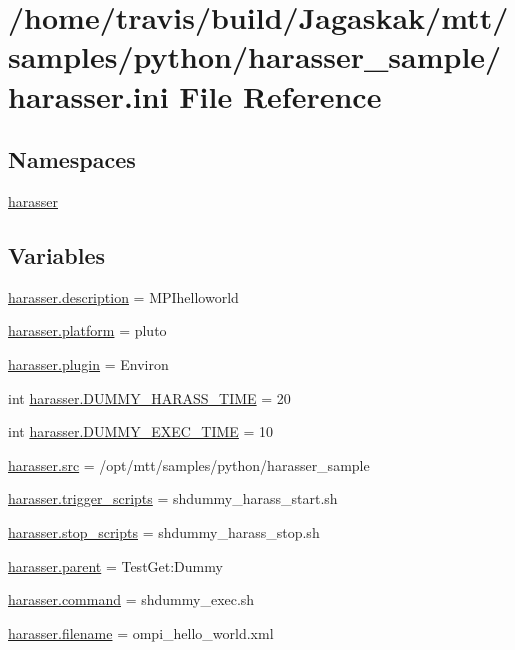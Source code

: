 \hypertarget{harasser_8ini}{\section{/home/travis/build/\-Jagaskak/mtt/samples/python/harasser\-\_\-sample/harasser.ini File Reference}
\label{harasser_8ini}
}
\subsection*{Namespaces}
\begin{DoxyCompactItemize}
\item 
\hyperlink{namespaceharasser}{harasser}
\end{DoxyCompactItemize}
\subsection*{Variables}
\begin{DoxyCompactItemize}
\item 
\hyperlink{namespaceharasser_ae9df0d8dd5280b3f68c1594d929d77e9}{harasser.\-description} = M\-P\-Ihelloworld
\item 
\hyperlink{namespaceharasser_aa827937946f071c462edd50adeffbf99}{harasser.\-platform} = pluto
\item 
\hyperlink{namespaceharasser_af41bea3324a7007e30dccbc1526e63b2}{harasser.\-plugin} = Environ
\item 
int \hyperlink{namespaceharasser_a5335f316caefd7dcb9a59e1541f56a10}{harasser.\-D\-U\-M\-M\-Y\-\_\-\-H\-A\-R\-A\-S\-S\-\_\-\-T\-I\-M\-E} = 20
\item 
int \hyperlink{namespaceharasser_a3663429ea3884044eef5813de2c88893}{harasser.\-D\-U\-M\-M\-Y\-\_\-\-E\-X\-E\-C\-\_\-\-T\-I\-M\-E} = 10
\item 
\hyperlink{namespaceharasser_a5cb1fdd5bdc77091984dbf7901fd7e00}{harasser.\-src} = /opt/mtt/samples/python/harasser\-\_\-sample
\item 
\hyperlink{namespaceharasser_aaf0bf1c41f9f803a38db036d20b51461}{harasser.\-trigger\-\_\-scripts} = shdummy\-\_\-harass\-\_\-start.\-sh
\item 
\hyperlink{namespaceharasser_acf2bbc7d9fff08e2232c16a79b0e72f4}{harasser.\-stop\-\_\-scripts} = shdummy\-\_\-harass\-\_\-stop.\-sh
\item 
\hyperlink{namespaceharasser_af9d9d7cb6a6d68880aeec6ccfa16ca23}{harasser.\-parent} = Test\-Get\-:\-Dummy
\item 
\hyperlink{namespaceharasser_a688e3d531b66f0b8013fd72625d9a0b5}{harasser.\-command} = shdummy\-\_\-exec.\-sh
\item 
\hyperlink{namespaceharasser_a8ee1446e84f466e788ff1e2b61666751}{harasser.\-filename} = ompi\-\_\-hello\-\_\-world.\-xml
\end{DoxyCompactItemize}
